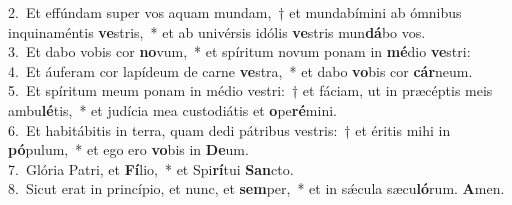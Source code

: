 {2.~}Et effúndam super vos aquam mundam,~† et mundabímini ab ómnibus inquinaméntis \textbf{ve}stris,~* et ab univérsis idólis \textbf{ve}stris mun\textbf{dá}bo vos.\\
{3.~}Et dabo vobis cor \textbf{no}vum,~* et spíritum novum ponam in \textbf{mé}dio \textbf{ve}stri:\\
{4.~}Et áuferam cor lapídeum de carne \textbf{ve}stra,~* et dabo \textbf{vo}bis cor \textbf{cár}neum.\\
{5.~}Et spíritum meum ponam in médio vestri:~† et fáciam, ut in præcéptis meis ambu\textbf{lé}tis,~* et judícia mea custodiátis et \textbf{o}pe\textbf{ré}mini.\\
{6.~}Et habitábitis in terra, quam dedi pátribus vestris:~† et éritis mihi in \textbf{pó}pulum,~* et ego ero \textbf{vo}bis in \textbf{De}um.\\
{7.~}Glória Patri, et \textbf{Fí}lio,~* et Spi\textbf{rí}tui \textbf{San}cto.\\
{8.~}Sicut erat in princípio, et nunc, et \textbf{sem}per,~* et in sǽcula sæcu\textbf{ló}rum. \textbf{A}men.\\
